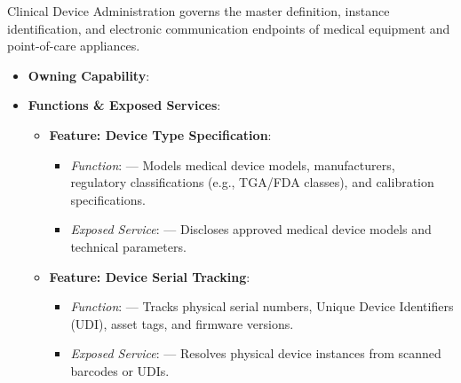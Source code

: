 Clinical Device Administration governs the master definition, instance identification, and electronic communication endpoints of medical equipment and point-of-care appliances.

\label{rad:em:193}

\begin{itemize}

\item 
\textbf{Owning Capability}: \texttt{}



\item 
\textbf{Functions \& Exposed Services}:


\begin{itemize}

\item 
\textbf{Feature: Device Type Specification}:


\begin{itemize}

\item 
\emph{Function}: \texttt{} — Models medical device models, manufacturers, regulatory classifications (e.g., TGA/\allowbreak{}FDA classes), and calibration specifications.



\item 
\emph{Exposed Service}: \texttt{} — Discloses approved medical device models and technical parameters.



\end{itemize}


\item 
\textbf{Feature: Device Serial Tracking}:


\begin{itemize}

\item 
\emph{Function}: \texttt{} — Tracks physical serial numbers, Unique Device Identifiers (UDI), asset tags, and firmware versions.



\item 
\emph{Exposed Service}: \texttt{} — Resolves physical device instances from scanned barcodes or UDIs.



\end{itemize}



\end{itemize}
\end{itemize}
